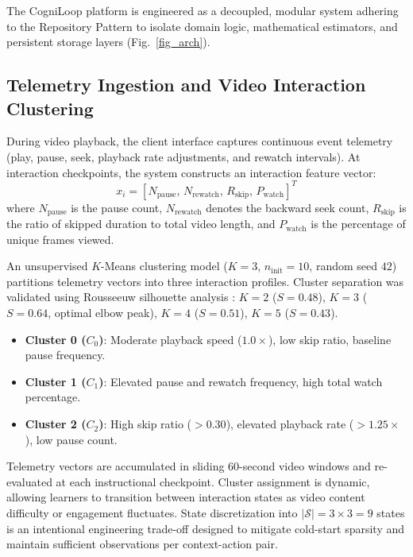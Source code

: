 \documentclass[journal]{IEEEtran}
\begin{document}
The CogniLoop platform is engineered as a decoupled, modular system adhering to the Repository Pattern to isolate domain logic, mathematical estimators, and persistent storage layers (Fig.~\ref{fig_arch}).

\subsection{Telemetry Ingestion and Video Interaction Clustering}
During video playback, the client interface captures continuous event telemetry (play, pause, seek, playback rate adjustments, and rewatch intervals). At interaction checkpoints, the system constructs an interaction feature vector:
\begin{equation}
x_i = \left[ N_{\text{pause}}, \, N_{\text{rewatch}}, \, R_{\text{skip}}, \, P_{\text{watch}} \right]^T
\end{equation}
where $N_{\text{pause}}$ is the pause count, $N_{\text{rewatch}}$ denotes the backward seek count, $R_{\text{skip}}$ is the ratio of skipped duration to total video length, and $P_{\text{watch}}$ is the percentage of unique frames viewed.

An unsupervised $K$-Means clustering model ($K=3$, $n_{\text{init}}=10$, random seed $42$) partitions telemetry vectors into three interaction profiles. Cluster separation was validated using Rousseeuw silhouette analysis \cite{rousseeuw1987silhouettes}: $K=2$ ($S=0.48$), $K=3$ ($S=\mathbf{0.64}$, optimal elbow peak), $K=4$ ($S=0.51$), $K=5$ ($S=0.43$).
\begin{itemize}
    \item \textbf{Cluster 0 ($C_0$)}: Moderate playback speed ($1.0\times$), low skip ratio, baseline pause frequency.
    \item \textbf{Cluster 1 ($C_1$)}: Elevated pause and rewatch frequency, high total watch percentage.
    \item \textbf{Cluster 2 ($C_2$)}: High skip ratio ($>0.30$), elevated playback rate ($>1.25\times$), low pause count.
\end{itemize}
Telemetry vectors are accumulated in sliding 60-second video windows and re-evaluated at each instructional checkpoint. Cluster assignment is dynamic, allowing learners to transition between interaction states as video content difficulty or engagement fluctuates. State discretization into $|\mathcal{S}| = 3 \times 3 = 9$ states is an intentional engineering trade-off designed to mitigate cold-start sparsity and maintain sufficient observations per context-action pair.
\end{document}

